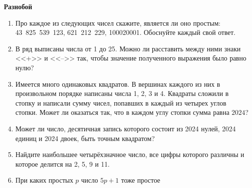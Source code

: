 \documentclass{article}
\begin{document}
\large
	
\begin{center}
	\textbf{Разнобой}
\end{center}


\begin{enumerate}[label*=\protect\fbox{\arabic{enumi}}]

\item Про каждое из следующих чисел скажите, является ли оно простым: 43 825 539 123, 621 212 229, 100020001. Обоснуйте каждый свой ответ.

\item В ряд выписаны числа от 1 до 25. Можно ли расставить между
ними знаки <<+>> и <<-->> так, чтобы значение полученного выражения
было равно нулю?

\item Имеется много одинаковых квадратов. В вершинах каждого из них в произвольном порядке написаны числа 1, 2, 3 и 4. Квадраты сложили в стопку и написали сумму чисел, попавших в каждый из четырех углов стопки. Может ли оказаться так, что в каждом углу стопки сумма равна $2024$?

\item Может ли число, десятичная запись которого состоит из 2024 нулей, 2024 единиц и 2024 двоек, быть точным квадратом?

\item Найдите наибольшее четырёхзначное число, все цифры которого различны и которое делится на 2, 5, 9 и 11.

\item При каких простых $p$ число $5p + 1$ тоже простое



\end{enumerate}
\end{document}
